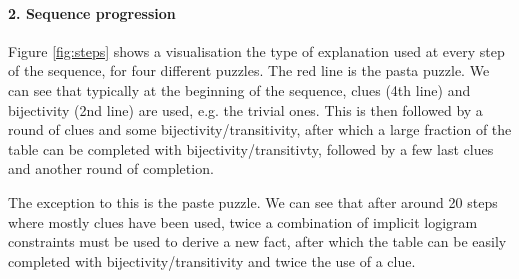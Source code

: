 \begin{table}
	\centering
\caption{Composition of puzzle explanations}
\label{table:composition}
\end{table}

\paragraph{2. Sequence progression}
Figure \ref{fig:steps} shows a visualisation the type of explanation used at every step of the sequence, for four different puzzles. The red line is the pasta puzzle. We can see that typically at the beginning of the sequence, clues (4th line) and bijectivity (2nd line) are used, e.g. the trivial ones. This is then followed by a round of clues and some bijectivity/transitivity, after which a large fraction of the table can be completed with bijectivity/transitivty, followed by a few last clues and another round of completion.

The exception to this is the paste puzzle. We can see that after around 20 steps where mostly clues have been used, twice a combination of implicit logigram constraints must be used to derive a new fact, after which the table can be easily completed with bijectivity/transitivity and twice the use of a clue.

